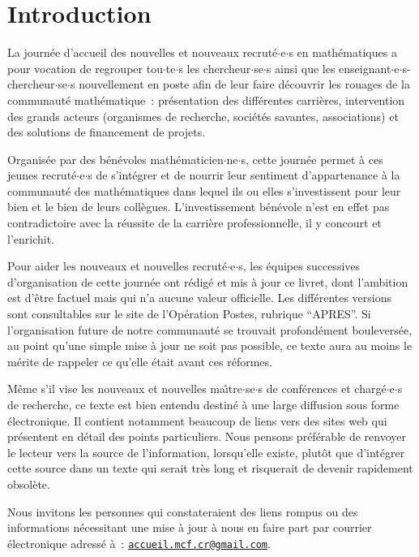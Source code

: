 \documentclass[11pt]{book}
\begin{document}
\setlength{\parskip}{.15cm}

\chapter*{Introduction}

La journ\'ee d'accueil des nouvelles et nouveaux recrut\'e$\cdot$e$\cdot$s en math\'ematiques a pour vocation de regrouper
tou$\cdot$te$\cdot$s les chercheur$\cdot$se$\cdot$s ainsi que les enseignant$\cdot$e$\cdot$s-chercheur$\cdot$se$\cdot$s nouvellement en poste afin de leur faire d\'ecouvrir
les rouages de la communaut\'e math\'ematique~: pr\'esentation des diff\'erentes carri\`eres, 
intervention des grands acteurs (organismes de recherche, soci\'et\'es savantes, associations)
et des solutions de financement de projets. 

Organis\'ee par des b\'en\'evoles math\'ematicien$\cdot$ne$\cdot$s, cette journ\'ee permet 
\`a ces jeunes recrut\'e$\cdot$e$\cdot$s de s'int\'egrer et de nourrir leur sentiment d'appartenance
\`a la communaut\'e des math\'ematiques dans lequel ils ou elles s'investissent pour leur bien et le bien de leurs coll\`egues.
L'investissement b\'en\'evole n'est en effet pas contradictoire avec la r\'eussite de la carri\`ere professionnelle,
il y concourt et l'enrichit.

Pour aider les nouveaux et nouvelles recrut\'e$\cdot$e$\cdot$s, les \'equipes successives d'organisation de cette journ\'ee
ont r\'edig\'e et mis \`a jour ce livret, dont l'ambition est d'\^etre factuel mais qui n'a aucune valeur officielle. 
Les diff\'erentes versions sont consultables sur le site de l'Op\'eration Postes, rubrique ``APRES''. 
Si l'organisation future de notre communaut\'e se trouvait profond\'ement boulevers\'ee,
au point qu'une simple mise \`a jour ne soit pas
possible, ce texte aura au moins le m\'erite de rappeler
ce qu'elle \'etait avant ces r\'eformes.

M\^eme s'il vise les nouveaux et nouvelles ma\^\i  tre$\cdot$se$\cdot$s de conf\'erences et
charg\'e$\cdot$e$\cdot$s de recherche, ce texte est bien entendu destin\'e \`a une
large diffusion sous forme \'electronique. Il contient notamment
beaucoup de liens vers des sites web qui pr\'esentent en d\'etail
des points particuliers. Nous pensons pr\'ef\'erable de renvoyer le
lecteur vers la source de l'information, lorsqu'elle existe,
plut\^ot que d'int\'egrer cette source dans un texte qui serait tr\`es long et
risquerait de devenir rapidement obsol\`ete.

Nous invitons les personnes qui constateraient des liens rompus ou
des informations n\'eces\-si\-tant une mise \`a jour \`a nous en
faire part par courrier \'electronique adress\'e \`a~:
\href{mailto:accueil.mcf.cr@gmail.com}{\texttt{accueil.mcf.cr@gmail.com}}.
\end{document}
